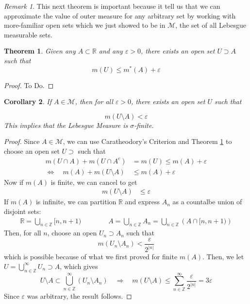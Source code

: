 \documentclass[12pt]{article}
\theoremstyle{plain}
\newtheorem{thm}{Theorem}[subsection]
\newtheorem{cor}[thm]{Corollary}
\theoremstyle{definition}
\theoremstyle{remark}
\newtheorem*{rmk}{Remark}
\begin{document}
\begin{rmk} This next theorem is important because it tell us that we can approximate the value of outer measure for any arbitrary set by working with more-familiar open sets which we just showed to be in $\mathscr{M}$, the set of all Lebesgue measurable sets.
\end{rmk}

\begin{thm} 
\label{openreg}    
Given any $A\subset\mathbb{R}$ and any $\varepsilon>0$, there exists an open set $U\supset A$ such that
\[
    m(U) \leq m^*(A) + \varepsilon
\]
\end{thm}
\begin{proof}
To Do.
\end{proof}

\begin{cor}
If $A\in\mathscr{M}$, then for all $\varepsilon>0$, there exists an open set $U$ such that 

\[
    m(U\setminus A) < \varepsilon
\]
This implies that the Lebesgue Measure is \emph{$\sigma$-finite}.
\end{cor}
\begin{proof}
Since $A\in\mathscr{M}$, we can use Caratheodory's Criterion and Theorem \ref{openreg} to choose an open set $U \supset $ such that  
\begin{align*}
    m(U\cap A) + m(U\cap A^c) &= m(U) \leq m(A) 
    +\varepsilon \\
    \Leftrightarrow  \quad
    m(A) + m(U\setminus A) &\leq m(A) +\varepsilon
\end{align*}
Now if $m(A)$ is finite, we can cancel to get 
\begin{align*}
    m(U\setminus A) &\leq \varepsilon
\end{align*}
If $m(A)$ is infinite, we can partition $\mathbb{R}$ and express $A_n$ as a countalbe union of disjoint sets:
\begin{align*}
    \mathbb{R} = \bigcup_{n\in\mathbb{Z}} [n,n+1)
    \qquad \qquad 
    A = \bigcup_{n\in\mathbb{Z}} A_n = 
    \bigcup_{n\in\mathbb{Z}} \left(A \cap [n,n+1)\right)
\end{align*}
Then, for all $n$, choose an open $U_n\supset A_n$ such that
\[
    m(U_n \setminus A_n) < \frac{\varepsilon}{2^{|n|}}
\]
which is possible because of what we first proved for finite $m(A)$. Then, we let $U = \bigcup^\infty_{n\in\mathbb{Z}} U_n \supset A$, which gives
\[
    U\setminus A \subset \bigcup^\infty_{n\in\mathbb{Z}}
    \left(U_n \setminus A_n \right)
    \quad \Rightarrow\quad
    m(U\setminus A) \leq \sum^\infty_{n\in\mathbb{Z}}
    \frac{\varepsilon}{2^{|n|}} = 3\varepsilon
\]
Since $\varepsilon$ was arbitrary, the result follows.
\end{proof}
\end{document}
